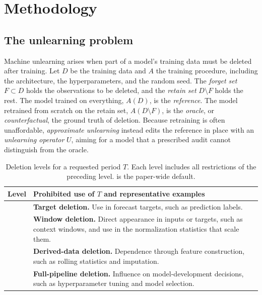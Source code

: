 \section{Methodology}\label{sec:method}

\subsection{The unlearning problem}

Machine unlearning arises when part of a model's training data must
be deleted after training. Let $D$ be the training data and $A$ the
training procedure, including the architecture, the hyperparameters,
and the random seed. The \emph{forget set} $F \subset D$ holds the
observations to be deleted, and the \emph{retain set} $D \setminus F$
holds the rest. The model trained on everything, $A(D)$, is the
\emph{reference}. The model retrained from scratch on the retain
set, $A(D \setminus F)$, is the \emph{oracle}, or
\emph{counterfactual}, the ground truth of deletion. Because
retraining is often unaffordable, \emph{approximate unlearning}
instead edits the reference in place with an \emph{unlearning
operator} $U$, aiming for a model that a prescribed audit cannot
distinguish from the oracle.

\begin{table}[t]
\centering
\caption{Deletion levels for a requested period $T$. Each level
includes all restrictions of the preceding level. \Lone{} is the
paper-wide default.}
\label{tab:deletion_levels}
\footnotesize
\begin{tabular}{@{}p{}p{}@{}}
\toprule
Level & Prohibited use of $T$ and representative examples \\
\midrule
\Lzero{} &
\textbf{Target deletion.}
Use in forecast targets, such as prediction labels. \\
\Lone{} &
\textbf{Window deletion.}
Direct appearance in inputs or targets, such as context windows,
and use in the normalization statistics that scale them. \\
\Ltwo{} &
\textbf{Derived-data deletion.}
Dependence through feature construction, such as rolling statistics
and imputation. \\
\Lthree{} &
\textbf{Full-pipeline deletion.}
Influence on model-development decisions, such as hyperparameter
tuning and model selection. \\
\bottomrule
\end{tabular}
\end{table}

